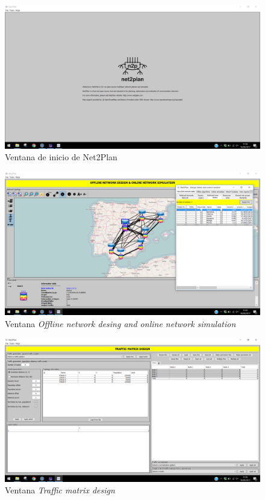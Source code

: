 \begin{figure}[ht!]
	\centering
	\includegraphics[width=1\linewidth]{imagenes/n2p_inicio}
	\caption{Ventana de inicio de Net2Plan}
	\label{fig:n2p_inicio}
\end{figure}
\begin{figure}[ht!]
	\centering
	\includegraphics[width=1\linewidth]{imagenes/n2p_redes}
	\caption{Ventana \textit{Offline network desing and online network simulation}}
	\label{fig:n2p_redes}
\end{figure}
\clearpage
\begin{figure}[ht!]
	\centering
	\includegraphics[width=1\linewidth]{imagenes/n2p_matriz}
	\caption{Ventana \textit{Traffic matrix design}}
	\label{fig:n2p_matriz}
\end{figure}

